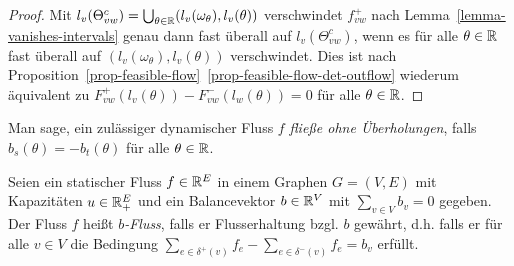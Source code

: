 \begin{proof}
	Mit $l_v(\Theta_{vw}^c) = \bigcup_{\theta\in\mathbb{R}}(l_v(\omega_\theta),l_v(\theta))$ verschwindet $f_{vw}^+$ nach Lemma~\ref{lemma-vanishes-intervals} genau dann fast überall auf $l_v(\Theta_{vw}^c)$, wenn es für alle $\theta\in\mathbb{R}$ fast überall auf $(l_v(\omega_\theta),l_v(\theta))$ verschwindet.
	Dies ist nach Proposition~\ref{prop-feasible-flow}~\ref{prop-feasible-flow-det-outflow} wiederum äquivalent zu
	$F_{vw}^+(l_v(\theta))-F_{vw}^-(l_w(\theta))=0$ für alle $\theta\in\mathbb{R}$.
\end{proof}

\begin{definition}
	Man sage, ein zulässiger dynamischer Fluss $f$ \emph{fließe ohne Überholungen}, falls $b_s(\theta) = -b_t(\theta)$ für alle $\theta\in\mathbb{R}$.
\end{definition}


\begin{definition}
	Seien ein statischer Fluss $f \in \mathbb{R}^E$ in einem Graphen $G=(V,E)$ mit Kapazitäten $u\in \mathbb{R}_+^E$ und ein Balancevektor $b\in\mathbb{R}^V$ mit $\sum_{v\in V} b_v = 0$ gegeben.
	Der Fluss $f$ heißt \emph{$b$-Fluss}, falls er Flusserhaltung bzgl. $b$ gewährt, d.h. falls er für alle $v\in V$ die Bedingung $\sum_{e\in\delta^+(v)}f_e - \sum_{e\in\delta^-(v)}f_e = b_v$ erfüllt.
\end{definition}



